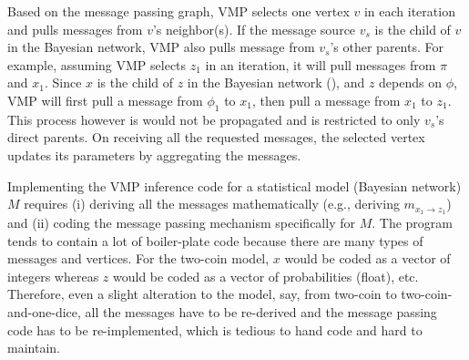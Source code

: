 Based on the message passing graph,
VMP selects one vertex $v$ in each iteration and 
pulls messages from $v$'s neighbor(s).
If the message source $v_s$ is the child of $v$ in the Bayesian network,
VMP also pulls message from $v_s$'s other parents. 
For example, assuming VMP selects $z_1$ in an iteration,
it will pull messages from $\pi$ and $x_1$.
Since $x$ is the child of $z$ in the Bayesian network (), 
and $z$ depends on $\phi$,
VMP will first pull a message from $\phi_1$ to $x_1$,
then pull a message from $x_1$ to $z_1$.
This process however is would not be propagated and is restricted to 
only $v_s$'s direct parents.
On receiving all the requested messages, 
the selected vertex updates its parameters by aggregating the messages. 

Implementing the VMP inference code for a statistical model 
(Bayesian network) $M$
requires (i) deriving all the messages mathematically  (e.g., deriving $m_{x_1 \rightarrow z_1}$)
and (ii) coding the message passing mechanism specifically for $M$.
The program tends to contain a lot of boiler-plate code 
because there are many types of messages and vertices.
For the two-coin model, 
$x$ would be coded as a vector of integers 
whereas $z$ would be coded as a vector of probabilities (float), etc.
Therefore, even a slight alteration to the model, say, from two-coin to 
two-coin-and-one-dice, all the messages have to be re-derived 
and the message passing code has to be re-implemented, which is tedious
to hand code and hard to maintain.


